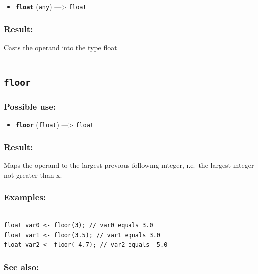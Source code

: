 \documentclass[]{book}
\providecommand{\tightlist}{%
  \setlength{\itemsep}{0pt}\setlength{\parskip}{0pt}}
\theoremstyle{definition}
\theoremstyle{definition}
\theoremstyle{definition}
\theoremstyle{remark}
\begin{document}
\begin{itemize}
\tightlist
\item
  \textbf{\texttt{float}} (\texttt{any}) ---\textgreater{}
  \texttt{float}
\end{itemize}

\subsubsection{Result:}\label{result-164}

Casts the operand into the type float

\begin{center}\rule{0.5\linewidth}{\linethickness}\end{center}

\subsection{\texorpdfstring{\texttt{floor}}{floor}}\label{floor}

\subsubsection{Possible use:}\label{possible-use-171}

\begin{itemize}
\tightlist
\item
  \textbf{\texttt{floor}} (\texttt{float}) ---\textgreater{}
  \texttt{float}
\end{itemize}

\subsubsection{Result:}\label{result-165}

Maps the operand to the largest previous following integer, i.e.~the
largest integer not greater than x.

\subsubsection{Examples:}\label{examples-126}

\begin{verbatim}
 
float var0 <- floor(3); // var0 equals 3.0 
float var1 <- floor(3.5); // var1 equals 3.0 
float var2 <- floor(-4.7); // var2 equals -5.0
\end{verbatim}

\subsubsection{See also:}\label{see-also-97}
\end{document}
